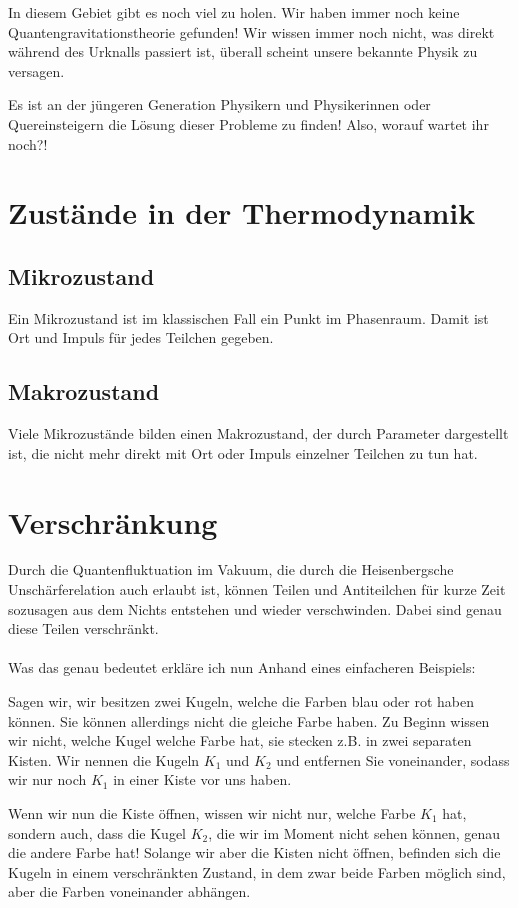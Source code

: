 \documentclass[ngerman]{scrartcl}
\begin{document}
	In diesem Gebiet gibt es noch viel zu holen. Wir haben immer noch keine Quantengravitationstheorie gefunden! Wir wissen immer noch nicht, was direkt während des Urknalls passiert ist, überall scheint unsere bekannte Physik zu versagen.
	
	Es ist an der jüngeren Generation Physikern und Physikerinnen oder Quereinsteigern die Lösung dieser Probleme zu finden! Also, worauf wartet ihr noch?!

\appendix
\section{Zustände in der Thermodynamik}

\subsection*{Mikrozustand}
Ein Mikrozustand ist im klassischen Fall ein Punkt im Phasenraum. Damit ist Ort und Impuls für jedes Teilchen gegeben.

\subsection*{Makrozustand}
Viele Mikrozustände bilden einen Makrozustand, der durch Parameter dargestellt ist, die nicht mehr direkt mit Ort oder Impuls einzelner Teilchen zu tun hat.

\section{Verschränkung} \label{Verschränkung}
	Durch die Quantenfluktuation im Vakuum, die durch die Heisenbergsche Unschärferelation auch erlaubt ist, können Teilen und Antiteilchen für kurze Zeit sozusagen aus dem Nichts entstehen und wieder verschwinden. Dabei sind genau diese Teilen verschränkt.
	\\ \\
	Was das genau bedeutet erkläre ich nun Anhand eines einfacheren Beispiels:
	
	Sagen wir, wir besitzen zwei Kugeln, welche die Farben blau oder rot haben können. Sie können allerdings nicht die gleiche Farbe haben. 
	Zu Beginn wissen wir nicht, welche Kugel welche Farbe hat, sie stecken z.B. in zwei separaten Kisten. Wir nennen die Kugeln $K_1$ und $K_2$ und entfernen Sie voneinander, sodass wir nur noch $K_1$ in einer Kiste vor uns haben. 
	
	Wenn wir nun die Kiste öffnen, wissen wir nicht nur, welche Farbe $K_1$ hat, sondern auch, dass die Kugel $K_2$, die wir im Moment nicht sehen können, genau die andere Farbe hat! 
	Solange wir aber die Kisten nicht öffnen, befinden sich die Kugeln in einem verschränkten Zustand, in dem zwar beide Farben möglich sind, aber die Farben voneinander abhängen. 
	
\end{document}
